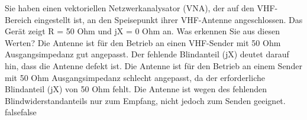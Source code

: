     {Sie haben einen vektoriellen Netzwerkanalysator (VNA), der auf den VHF-Bereich eingestellt ist, an den Speisepunkt ihrer VHF-Antenne angeschlossen. Das Gerät zeigt R = 50 Ohm und jX = 0 Ohm an. Was erkennen Sie aus diesen Werten?}
    {Die Antenne ist für den Betrieb an einen VHF-Sender mit 50 Ohm Ausgangsimpedanz gut angepasst.}
    {Der fehlende Blindanteil (jX) deutet darauf hin, dass die Antenne defekt ist.}
    {Die Antenne ist für den Betrieb an einem Sender mit 50 Ohm Ausgangsimpedanz schlecht angepasst, da der erforderliche Blindanteil (jX) von 50 Ohm fehlt.}
    {Die Antenne ist wegen des fehlenden Blindwiderstandanteils nur zum Empfang, nicht jedoch zum Senden geeignet.}
    {false}{false}